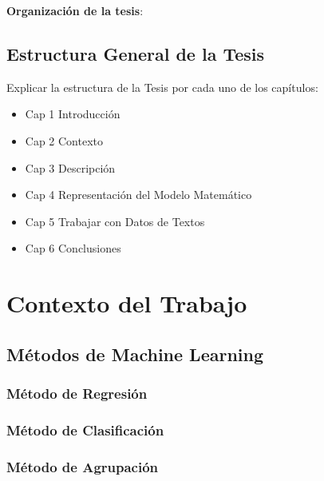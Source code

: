 \documentclass[12pt, runningheads,a4]{book}
\begin{document}
\newpage

\noindent
{\bf Organización de la tesis}:

\section{Estructura General de la Tesis}

Explicar la estructura de la Tesis por cada uno de los capítulos:

\begin{itemize}
	\item Cap 1 Introducción
	\item Cap 2 Contexto 
	\item Cap 3 Descripción 
	\item Cap 4 Representación del Modelo Matemático
	\item Cap 5 Trabajar con Datos de Textos
	\item Cap 6 Conclusiones
\end{itemize}



\newpage






\chapter{Contexto del Trabajo} \label{cap.2}

\section{Métodos de Machine Learning}

	\subsection{Método de Regresión}

	\subsection{Método de Clasificación}

	\subsection{Método de Agrupación}
\end{document}
